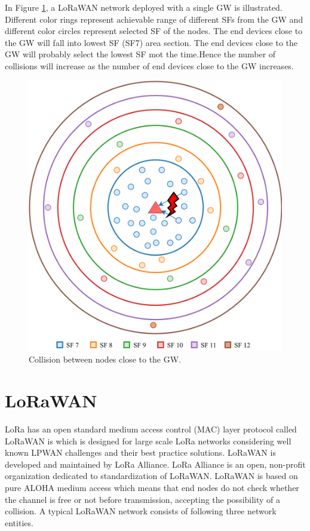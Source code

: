 \documentclass[conference]{IEEEtran}
\begin{document}
\par In Figure \ref{fig:collision}, a LoRaWAN network deployed with a single GW is illustrated. Different color rings represent achievable range of different SFs from the GW and different color circles represent selected SF of the nodes. The end devices close to the GW will fall into lowest SF (SF7) area section. The end devices close to the GW will probably select the lowest SF mot the time.Hence the number of collisions will increase as the number of end devices close to the GW increases.

\begin{figure}
\centering
\includegraphics[width=\linewidth]{collision}
\caption{Collision between nodes close to the GW.}
\label{fig:collision}
\end{figure}


\section{LoRaWAN} \label{LoRaWAN}
\par LoRa has an open standard medium access control (MAC) layer protocol called LoRaWAN is which is designed for large scale LoRa networks considering well known LPWAN challenges and their best practice solutions. LoRaWAN is developed and maintained by LoRa Alliance. LoRa Alliance is an open, non-profit organization dedicated to standardization of LoRaWAN. LoRaWAN is based on pure ALOHA medium access which means that end nodes do not check whether the channel is free or not before transmission, accepting the possibility of a collision. A typical LoRaWAN network consists of following three network entities.
\end{document}
